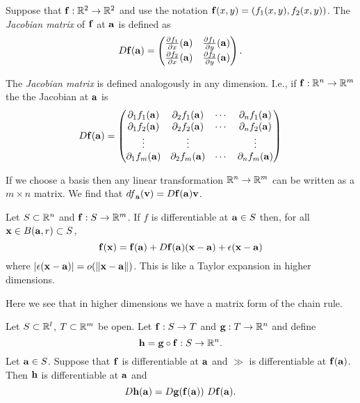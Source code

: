 \begin{definition}
    Suppose that \(\ff: \bR^2 \to \bR^2\) and use the notation \(\ff(x,y) = (f_1(x,y),f_2(x,y))\).
    The \emph{Jacobian matrix} of \(\ff\) at \(\aa\) is defined as
    \[
        D\ff(\aa) =
        \begin{pmatrix}
            \frac{\partial f_1}{\partial x} (\aa) & \frac{\partial f_1}{\partial y} (\aa) \\[2pt]
            \frac{\partial f_2}{\partial x} (\aa) & \frac{\partial f_2}{\partial y} (\aa)
        \end{pmatrix}.
    \]
\end{definition}

The \emph{Jacobian matrix} is defined analogously in any dimension.
I.e., if \(\ff : \bR^n \to \bR^m\) the the Jacobian at \(\aa\) is
\[
    D\ff(\aa) =
    \begin{pmatrix}
        \partial_1 f_1 (\aa) & \partial_2 f_1 (\aa) & \cdots & \partial_n f_1 (\aa) \\
        \partial_1 f_2 (\aa) & \partial_2 f_2 (\aa) & \cdots & \partial_n f_2 (\aa) \\
        \vdots               & \vdots               &        & \vdots               \\
        \partial_1 f_m (\aa) & \partial_2 f_m (\aa) & \cdots & \partial_n f_m (\aa)
    \end{pmatrix}
\]


If we choose a basis then any linear transformation \(\bR^n \to \bR^m\) can be written as a \(m \times n\) matrix.
We find that \( {df}_{\aa}(\vv ) = D\ff(\aa) \vv\).

Let \(S\subset \bR^n\) and \(\ff : S \to \bR^m\).
If \(f\) is differentiable at \(\aa \in S\) then, for all  \(\xx\in B(\aa,r) \subset S\),
\[
    \ff(\xx) = \ff(\aa) +  D\ff(\aa) (\xx-\aa) + \epsilon(\xx-\aa)
\]
where \(\abs{\epsilon(\xx-\aa)} = \littleo{\norm{\xx-\aa}}\).
This is like a Taylor expansion in higher dimensions.

Here we see that in higher dimensions we have a matrix form of the chain rule.

\begin{theorem}%
    \label{thm:jacobian-chain}
    Let \(S\subset \bR^l\), \(T\subset \bR^m\) be open.
    Let \(\ff: S \to T\) and \(\gg:T \to \bR^n\) and define
    \[
        \hh = \gg \circ \ff : S \to \bR^n.
    \]
    Let  \(\aa\in S\). Suppose that \(\ff\) is differentiable at \(\aa\) and \(\gg\) is differentiable at \(\ff(\aa)\).
    Then \(\hh\) is differentiable at \(\aa\) and
    \[
        D\hh(\aa) = D\gg(\ff(\aa)) \ D\ff(\aa).
    \]
\end{theorem}

